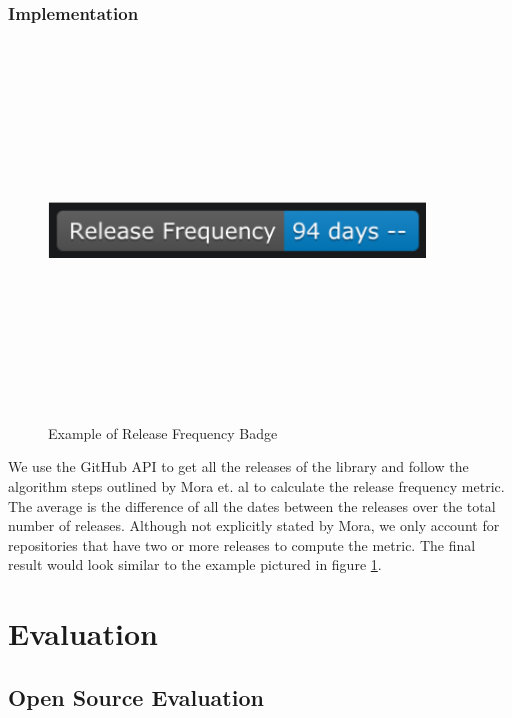 \documentclass[12pt, letterpaper]{article}
\begin{document}
\subsubsection{Implementation}

\begin{figure}[!htb]
    \centerline{
        \includegraphics[width=10cm,height=10cm,keepaspectratio=true]{releasebadge}
    }
    \caption{
        Example of Release Frequency Badge
    }
    \label{releasebadge}
\end{figure}

We use the GitHub \cite{github} API to get all the releases of the library and follow the algorithm
steps outlined by Mora et. al \cite{metrics} to calculate the release frequency metric.
The average is the difference of all the dates between the releases over the total number of releases.
Although not explicitly stated by Mora, we only account for repositories that have two or more releases to compute
the metric. The final result would look similar to the example pictured in figure \ref{releasebadge}.


\section{Evaluation}

\subsection{Open Source Evaluation}
\end{document}
